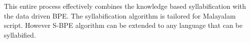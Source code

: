 This entire process effectively combines the knowledge based syllabification
with the data driven BPE. The syllabification algorithm is tailored for
Malayalam script. However S-BPE algorithm can be extended to any language that
can be syllabified.






